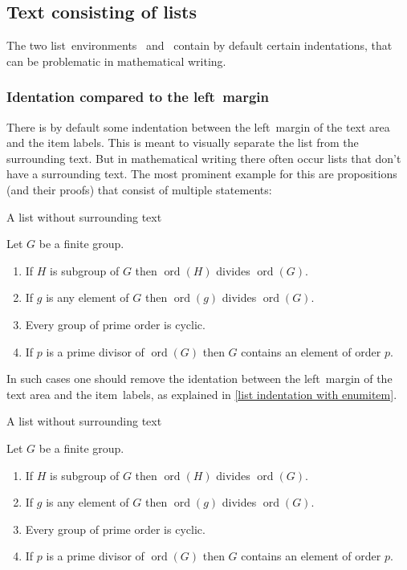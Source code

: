\subsection{Text consisting of lists}

The two list~environments~ and~ contain by default certain indentations, that can be problematic in mathematical writing.

\subsubsection{Identation compared to the left~margin}

There is by default some indentation between the left~margin of the text area and the item labels.
This is meant to visually separate the list from the surrounding text.
But in mathematical writing there often occur lists that don’t have a surrounding text.
The most prominent example for this are propositions (and their proofs) that consist of multiple statements:
\begin{showlatex}{A list without surrounding text}
\begin{theorem}
  Let $G$ be a finite group.
  \begin{enumerate}
    \item
      If $H$ is subgroup of $G$ then $\operatorname{ord}(H)$ divides $\operatorname{ord}(G)$.
    \item
      If $g$ is any element of $G$ then $\operatorname{ord}(g)$ divides $\operatorname{ord}(G)$.
    \item
      Every group of prime order is cyclic.
    \item
      If $p$ is a prime divisor of $\operatorname{ord}(G)$ then $G$ contains an element of order $p$.
  \end{enumerate}
\end{theorem}
\end{showlatex}

In such cases one should remove the identation between the left~margin of the text area and the item~labels, as explained in \cref{list indentation with enumitem}.
\begin{showlatex}{A list without surrounding text}
\begin{theorem}
  Let $G$ be a finite group.
  \begin{enumerate}[wide = 0pt, leftmargin=*]
    \item
      If $H$ is subgroup of $G$ then $\operatorname{ord}(H)$ divides $\operatorname{ord}(G)$.
    \item
      If $g$ is any element of $G$ then $\operatorname{ord}(g)$ divides $\operatorname{ord}(G)$.
    \item
      Every group of prime order is cyclic.
    \item
      If $p$ is a prime divisor of $\operatorname{ord}(G)$ then $G$ contains an element of order $p$.
  \end{enumerate}
\end{theorem}
\end{showlatex}



